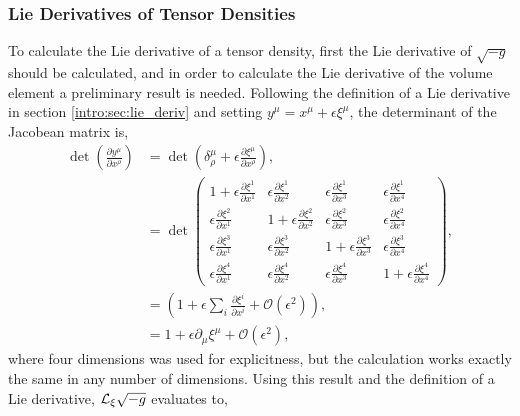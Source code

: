 \subsubsection{Lie Derivatives of Tensor Densities}
To calculate the Lie derivative of a tensor density, first the Lie derivative of $\sqrt{-g}$ should be calculated, and in order to calculate the Lie derivative of the volume element a preliminary result is needed. Following the definition of a Lie derivative in section \ref{intro:sec:lie_deriv} and setting $y^\mu = x^\mu + \epsilon \xi^\mu$, the determinant of the Jacobean matrix is,
\begin{align}
 \det\left(\frac{\partial y^\mu}{\partial x^\rho}\right) 
&= \det\left(\delta^\mu_\rho + \epsilon \frac{\partial \xi^\mu}{\partial x^\rho}\right) ,\\ 
&= \det\begin{pmatrix} 
1+\epsilon\frac{\partial \xi^1}{\partial x^1}& \epsilon\frac{\partial \xi^1}{\partial x^2}& \epsilon\frac{\partial \xi^1}{\partial x^3}& \epsilon\frac{\partial \xi^1}{\partial x^4}\\
\epsilon\frac{\partial \xi^2}{\partial x^1}& 1+\epsilon\frac{\partial \xi^2}{\partial x^2}& \epsilon\frac{\partial \xi^2}{\partial x^3}& \epsilon\frac{\partial \xi^2}{\partial x^4}\\
\epsilon\frac{\partial \xi^3}{\partial x^1}& \epsilon\frac{\partial \xi^3}{\partial x^2}& 1+\epsilon\frac{\partial \xi^3}{\partial x^3}& \epsilon\frac{\partial \xi^3}{\partial x^4}\\ 
\epsilon\frac{\partial \xi^4}{\partial x^1}&\epsilon\frac{\partial \xi^4}{\partial x^2} & \epsilon\frac{\partial \xi^4}{\partial x^3}& 1+\epsilon\frac{\partial \xi^4}{\partial x^4}\end{pmatrix} ,\\
&=\left(1 + \epsilon \sum_i \frac{\partial \xi^i}{\partial x^i} + \mathcal{O}(\epsilon^2)\right) ,\\
&=1 + \epsilon \partial_\mu \xi^\mu + \mathcal{O}(\epsilon^2),
\end{align}
where four dimensions was used for explicitness, but the calculation works exactly the same in any number of dimensions. Using this result and the definition of a Lie derivative, $\mathcal{L}_\xi \sqrt{-g}$ evaluates to,
